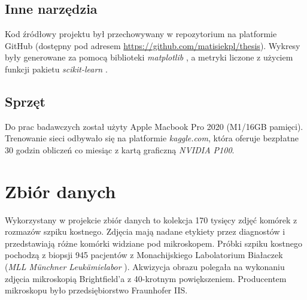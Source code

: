 \subsection{Inne narzędzia}

Kod źródłowy projektu był przechowywany w repozytorium na platformie GitHub (dostępny pod adresem \url{https://github.com/matisiekpl/thesis}).
Wykresy były generowane za pomocą biblioteki \textit{matplotlib} \cite{matplotlib},
a metryki liczone z użyciem funkcji pakietu \textit{scikit-learn} \cite{scikit_learn}.

\subsection{Sprzęt}

Do prac badawczych został użyty Apple Macbook Pro 2020 (M1/16GB pamięci). Trenowanie sieci odbywało się na platformie \textit{kaggle.com}, która oferuje bezpłatne 30 godzin obliczeń co miesiąc z kartą graficzną \textit{NVIDIA P100}.


\section{Zbiór danych}

Wykorzystany w projekcie zbiór danych to kolekcja 170 tysięcy zdjęć komórek z rozmazów szpiku kostnego.
Zdjęcia mają nadane etykiety przez diagnostów i przedstawiają różne komórki widziane pod mikroskopem.
Próbki szpiku kostnego pochodzą z biopsji 945 pacjentów z Monachijskiego Labolatorium Białaczek (\textit{MLL Münchner Leukämielabor} \cite{mll}).
Akwizycja obrazu polegała na wykonaniu zdjęcia mikroskopią Brightfield'a z 40-krotnym powiększeniem.
Producentem mikroskopu było przedsiębiorstwo Fraunhofer IIS.

